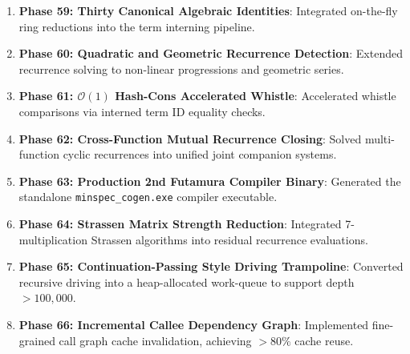 \begin{enumerate}
    \item \textbf{Phase 59: Thirty Canonical Algebraic Identities}: Integrated on-the-fly ring reductions into the term interning pipeline.
    \item \textbf{Phase 60: Quadratic and Geometric Recurrence Detection}: Extended recurrence solving to non-linear progressions and geometric series.
    \item \textbf{Phase 61: $\mathcal{O}(1)$ Hash-Cons Accelerated Whistle}: Accelerated whistle comparisons via interned term ID equality checks.
    \item \textbf{Phase 62: Cross-Function Mutual Recurrence Closing}: Solved multi-function cyclic recurrences into unified joint companion systems.
    \item \textbf{Phase 63: Production 2nd Futamura Compiler Binary}: Generated the standalone \texttt{minspec\_cogen.exe} compiler executable.
    \item \textbf{Phase 64: Strassen Matrix Strength Reduction}: Integrated 7-multiplication Strassen algorithms into residual recurrence evaluations.
    \item \textbf{Phase 65: Continuation-Passing Style Driving Trampoline}: Converted recursive driving into a heap-allocated work-queue to support depth $>100,000$.
    \item \textbf{Phase 66: Incremental Callee Dependency Graph}: Implemented fine-grained call graph cache invalidation, achieving $>80\%$ cache reuse.
\end{enumerate}
